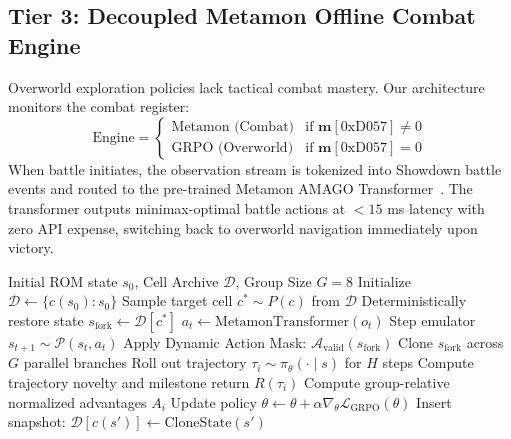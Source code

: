 \documentclass[journal,10pt,twocolumn]{IEEEtran}
\begin{document}
\subsection{Tier 3: Decoupled Metamon Offline Combat Engine}
Overworld exploration policies lack tactical combat mastery. Our architecture monitors the combat register:
\begin{equation}
\text{Engine} = \begin{cases}
\text{Metamon (Combat)} & \text{if } \mathbf{m}[\text{0xD057}] \ne 0 \\
\text{GRPO (Overworld)} & \text{if } \mathbf{m}[\text{0xD057}] = 0
\end{cases}
\end{equation}
When battle initiates, the observation stream is tokenized into Showdown battle events and routed to the pre-trained Metamon AMAGO Transformer~\cite{grigsby2025metamon,grigsby2024amago}. The transformer outputs minimax-optimal battle actions at $<15$ ms latency with zero API expense, switching back to overworld navigation immediately upon victory.

\begin{algorithm}[h]
\caption{Unified Neuro-Symbolic JRPG Master Progression Loop}
\label{alg:unified_agent}
\begin{algorithmic}[1]
\REQUIRE Initial ROM state $s_0$, Cell Archive $\mathcal{D}$, Group Size $G=8$
\STATE Initialize $\mathcal{D} \leftarrow \{c(s_0): s_0\}$
    \STATE Sample target cell $c^* \sim P(c)$ from $\mathcal{D}$
    \STATE Deterministically restore state $s_{\text{fork}} \leftarrow \mathcal{D}[c^*]$
        \STATE $a_t \leftarrow \text{MetamonTransformer}(o_t)$
        \STATE Step emulator $s_{t+1} \sim \mathcal{P}(s_t, a_t)$
    \ELSE
        \STATE Apply Dynamic Action Mask: $\mathcal{A}_{\text{valid}}(s_{\text{fork}})$
        \STATE Clone $s_{\text{fork}}$ across $G$ parallel branches
            \STATE Roll out trajectory $\tau_i \sim \pi_\theta(\cdot \mid s)$ for $H$ steps
            \STATE Compute trajectory novelty and milestone return $R(\tau_i)$
        \ENDFOR
        \STATE Compute group-relative normalized advantages $A_i$
        \STATE Update policy $\theta \leftarrow \theta + \alpha \nabla_\theta \mathcal{L}_{\text{GRPO}}(\theta)$
                \STATE Insert snapshot: $\mathcal{D}[c(s')] \leftarrow \text{CloneState}(s')$
            \ENDIF
        \ENDFOR
    \ENDIF
\ENDWHILE
\end{algorithmic}
\end{algorithm}
\end{document}
